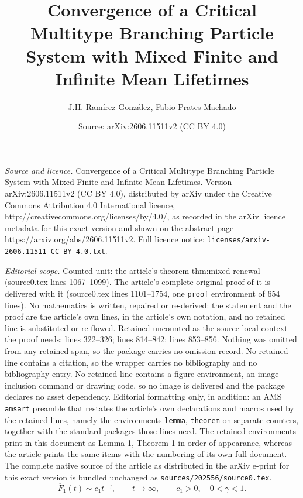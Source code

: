 \documentclass[10pt,a4paper]{amsart}
\title{Convergence of a Critical Multitype Branching Particle System with Mixed Finite and Infinite Mean Lifetimes}
\author{J.H. Ram\'{i}rez-Gonz\'{a}lez, Fabio Prates Machado}
\date{Source: arXiv:2606.11511v2 (CC BY 4.0)}
\begin{document}
\maketitle

\noindent\emph{Source and licence.} Convergence of a Critical Multitype Branching Particle System with Mixed Finite and Infinite Mean Lifetimes. Version arXiv:2606.11511v2 (CC BY 4.0), distributed by arXiv under the Creative Commons Attribution 4.0 International licence, http://creativecommons.org/licenses/by/4.0/, as recorded in the arXiv licence metadata for this exact version and shown on the abstract page https://arxiv.org/abs/2606.11511v2. Full licence notice: \texttt{licenses/arxiv-2606.11511-CC-BY-4.0.txt}.\par\smallskip

\noindent\textit{Editorial scope.} Counted unit: the article's theorem thm:mixed-renewal (source0.tex lines 1067--1099). The article's complete original proof of it is delivered with it (source0.tex lines 1101--1754, one \texttt{proof} environment of 654 lines). No mathematics is written, repaired or re-derived: the statement and the proof are the article's own lines, in the article's own notation, and no retained line is substituted or re-flowed.  Retained uncounted as the source-local context the proof needs: lines 322--326; lines 814--842; lines 853--856.  Nothing was omitted from any retained span, so the package carries no omission record.  No retained line contains a citation, so the wrapper carries no bibliography and no bibliography entry.  No retained line contains a figure environment, an image-inclusion command or drawing code, so no image is delivered and the package declares no asset dependency.  Editorial formatting only, in addition: an AMS \texttt{amsart} preamble that restates the article's own declarations and macros used by the retained lines, namely the environments \texttt{lemma}, \texttt{theorem} on separate counters, together with the standard packages those lines need.  The retained environments print in this document as Lemma 1, Theorem 1 in order of appearance, whereas the article prints the same items with the numbering of its own full document.  The complete native source of the article as distributed in the arXiv e-print for this exact version is bundled unchanged as \texttt{sources/202556/source0.tex}.
\begin{equation}\label{eq:F1-heavy-tail}
  \overline F_1(t)\sim c_1t^{-\gamma},
  \qquad t\to\infty,
  \qquad c_1>0,\quad 0<\gamma<1.
\end{equation}
\end{document}
